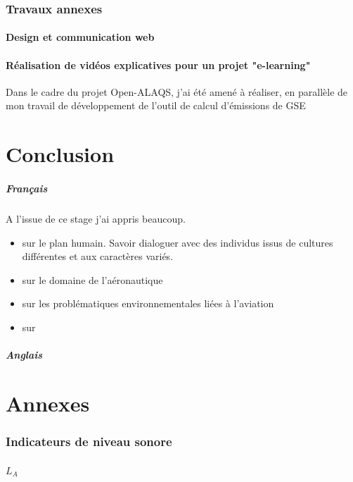 \documentclass[a4paper]{article}
\begin{document}
    \section{Travaux annexes}
    \subsection{Design et communication web}
    \subsection{Réalisation de vidéos explicatives pour un projet "e-learning"}
    Dans le cadre du projet Open-ALAQS, j'ai été amené à réaliser, en parallèle de mon travail de développement de l'outil de calcul d'émissions de GSE
    \newpage
    
    \part{Conclusion}
    \subsubsection*{Français}
    A l'issue de ce stage j'ai appris beaucoup.
    \begin{itemize}
        \item sur le plan humain. Savoir dialoguer avec des individus issus de cultures différentes et aux caractères variés.
        \item sur le domaine de l'aéronautique
        \item sur les problématiques environnementales liées à l'aviation
        \item sur 
    \end{itemize}
    \subsubsection*{Anglais}
    \newpage
    
    \appendix
    \part*{Annexes}
    \section{Indicateurs de niveau sonore}
    \paragraph{$L_{A}$}
    \newpage
    
\end{document}
